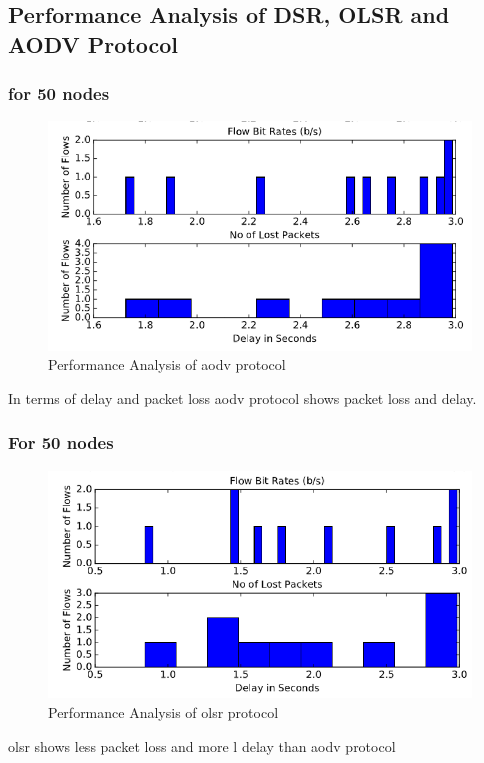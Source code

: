 \documentclass[12pt,a4paper]{report}
\begin{document}
\newpage
\subsection{Performance Analysis of DSR, OLSR and AODV Protocol}

\subsubsection{for 50 nodes}

\begin{figure}[hbtp]
\centering
\includegraphics[scale=.7]{aodv1.png}
\caption{Performance Analysis of aodv protocol}
\end{figure}
In terms of delay and packet loss aodv protocol shows packet loss and delay.

\subsubsection{For 50 nodes}

\begin{figure}[hbtp]
\centering
\includegraphics[scale=.7]{olsr1.png}
\caption{Performance Analysis of olsr protocol}
\end{figure}
olsr shows less packet loss and more l delay than  aodv protocol
\newpage
\end{document}
